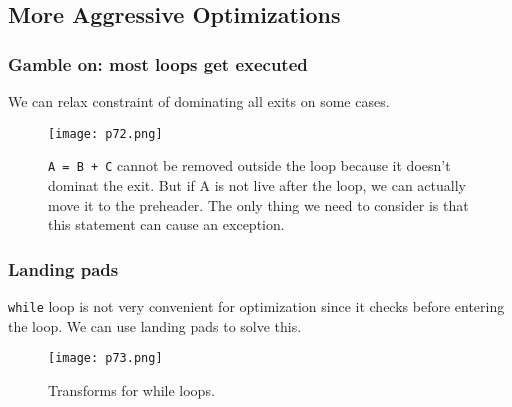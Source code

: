 \subsection{More Aggressive Optimizations}

\subsubsection{Gamble on: most loops get executed}

We can relax constraint of dominating all exits on some cases.

\begin{figure}[H]
    \centering
     \texttt{[image: p72.png]}
         \caption{\texttt{A = B + C} cannot be removed outside the loop because it doesn't dominat the exit. But if A is not live after the loop, we can actually move it to the preheader. The only thing we need to consider is that this statement can cause an exception.}
         \label{fig:p72}
\end{figure}


\subsubsection{Landing pads}
\texttt{while} loop is not very convenient for optimization since it checks before entering the loop.  We can use landing pads to solve this.

\begin{figure}[H]
    \centering
     \texttt{[image: p73.png]}
         \caption{Transforms for while loops.}
         \label{fig:p73}
\end{figure}
